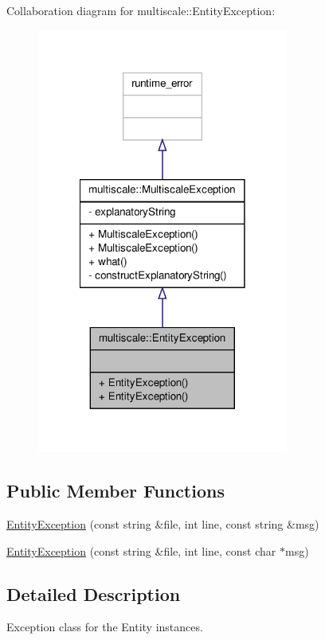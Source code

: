 Collaboration diagram for multiscale\-:\-:Entity\-Exception\-:\nopagebreak
\begin{figure}[H]
\begin{center}
\leavevmode
\includegraphics[width=234pt]{classmultiscale_1_1EntityException__coll__graph}
\end{center}
\end{figure}
\subsection*{Public Member Functions}
\begin{DoxyCompactItemize}
\item 
\hyperlink{classmultiscale_1_1EntityException_a8e0ef42ea6ab6ac863f64f8859a5002a}{Entity\-Exception} (const string \&file, int line, const string \&msg)
\item 
\hyperlink{classmultiscale_1_1EntityException_a62f57c4bcc93e31adbd5ca1bb40d4b0d}{Entity\-Exception} (const string \&file, int line, const char $\ast$msg)
\end{DoxyCompactItemize}


\subsection{Detailed Description}
Exception class for the Entity instances. 

